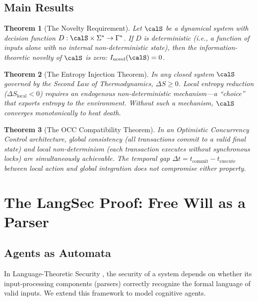 \documentclass[12pt, a4paper]{article}
\theoremstyle{plain}
\newtheorem{theorem}{Theorem}[section]
\theoremstyle{definition}
\begin{document}
\subsection{Main Results}

\begin{theorem}[The Novelty Requirement]\label{thm:novelty}
  Let $\calS$ be a dynamical system with decision function
  $D: \calS \times \Sigma^* \to \Gamma^*$. If $D$ is deterministic
  (i.e., a function of inputs alone with no internal non-deterministic
  state), then the information-theoretic novelty of $\calS$ is zero:
  $I_{\text{novel}}(\calS) = 0$.
\end{theorem}

\begin{theorem}[The Entropy Injection Theorem]\label{thm:entropy}
  In any closed system $\calS$ governed by the Second Law of Thermodynamics,
  $\Delta S \geq 0$. Local entropy reduction ($\Delta S_{\text{local}} < 0$)
  requires an endogenous non-deterministic mechanism---a ``choice'' that
  exports entropy to the environment. Without such a mechanism, $\calS$
  converges monotonically to heat death.
\end{theorem}

\begin{theorem}[The OCC Compatibility Theorem]\label{thm:occ}
  In an Optimistic Concurrency Control architecture, global consistency
  (all transactions commit to a valid final state) and local non-determinism
  (each transaction executes without synchronous locks) are simultaneously
  achievable. The temporal gap $\Delta t = t_{\text{commit}} - t_{\text{execute}}$
  between local action and global integration does not compromise either property.
\end{theorem}

\section{The LangSec Proof: Free Will as a Parser}\label{sec:langsec}

\subsection{Agents as Automata}

In Language-Theoretic Security \citep{Bratus2014}, the security of a system
depends on whether its input-processing components (parsers) correctly
recognize the formal language of valid inputs. We extend this framework to
model cognitive agents.
\end{document}
